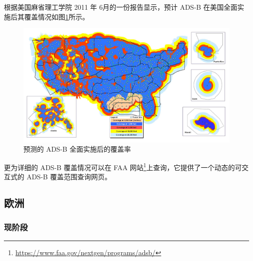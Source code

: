 
根据美国麻省理工学院 2011 年 6月的一份报告显示，预计 ADS-B 在美国全面实施后其覆盖情况如图\ref{fig:ADSB-final}所示。

\begin{figure}[htbp]
\centering
\includegraphics[width=14cm]{pic/ADSB-final.png}
\caption{预测的 ADS-B 全面实施后的覆盖率\protect\footnotemark}
\label{fig:ADSB-final}
\end{figure}


更为详细的 ADS-B 覆盖情况可以在 FAA 网站\footnote{\url{https://www.faa.gov/nextgen/programs/adsb/}}上查询，它提供了一个动态的可交互式的 ADS-B 覆盖范围查询网页。

\subsection{欧洲}

\subsubsection{现阶段}

